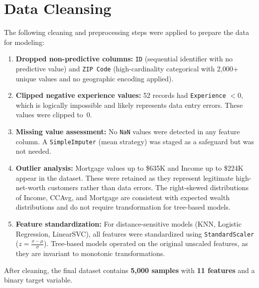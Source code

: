 \documentclass[11pt, a4paper]{article}
\begin{document}
\section{Data Cleansing}

The following cleaning and preprocessing steps were applied to prepare the data
for modeling:

\begin{enumerate}[leftmargin=*, itemsep=4pt]
    \item \textbf{Dropped non-predictive columns:} \texttt{ID} (sequential
          identifier with no predictive value) and \texttt{ZIP Code}
          (high-cardinality categorical with 2{,}000+ unique values and no
          geographic encoding applied).

    \item \textbf{Clipped negative experience values:} 52 records had
          \texttt{Experience} $< 0$, which is logically impossible and likely
          represents data entry errors. These values were clipped to~0.

    \item \textbf{Missing value assessment:} No \texttt{NaN} values were
          detected in any feature column. A \texttt{SimpleImputer} (mean
          strategy) was staged as a safeguard but was not needed.

    \item \textbf{Outlier analysis:} Mortgage values up to \$635K and Income
          up to \$224K appear in the dataset. These were retained as they
          represent legitimate high-net-worth customers rather than data errors.
          The right-skewed distributions of Income, CCAvg, and Mortgage are
          consistent with expected wealth distributions and do not require
          transformation for tree-based models.

    \item \textbf{Feature standardization:} For distance-sensitive models (KNN,
          Logistic Regression, LinearSVC), all features were standardized using
          \texttt{StandardScaler} ($z = \frac{x - \mu}{\sigma}$). Tree-based
          models operated on the original unscaled features, as they are
          invariant to monotonic transformations.
\end{enumerate}

After cleaning, the final dataset contains \textbf{5{,}000 samples} with
\textbf{11 features} and a binary target variable.
\end{document}
